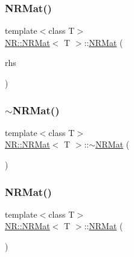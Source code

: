 \mbox{\label{classNR_1_1NRMat_a7ad1dc6f56c44d5d0a7b595d48206cfa}} 
\subsubsection{\texorpdfstring{NRMat()}{NRMat()}\hspace{0.1cm}{\footnotesize\ttfamily [10/15]}}
{\footnotesize\ttfamily template$<$class T$>$ \\
\mbox{\hyperlink{classNR_1_1NRMat}{N\+R\+::\+N\+R\+Mat}}$<$ T $>$\+::\mbox{\hyperlink{classNR_1_1NRMat}{N\+R\+Mat}} (\begin{DoxyParamCaption}\item[{const \mbox{\hyperlink{classNR_1_1NRMat}{N\+R\+Mat}}$<$ T $>$ \&}]{rhs }\end{DoxyParamCaption})}

\mbox{\label{classNR_1_1NRMat_a8b6826b7a7556a397ee7d7ad382e5dae}} 
\subsubsection{\texorpdfstring{$\sim$NRMat()}{~NRMat()}\hspace{0.1cm}{\footnotesize\ttfamily [2/3]}}
{\footnotesize\ttfamily template$<$class T$>$ \\
\mbox{\hyperlink{classNR_1_1NRMat}{N\+R\+::\+N\+R\+Mat}}$<$ T $>$\+::$\sim$\mbox{\hyperlink{classNR_1_1NRMat}{N\+R\+Mat}} (\begin{DoxyParamCaption}{ }\end{DoxyParamCaption})}

\mbox{\label{classNR_1_1NRMat_abcaca2687429fc0f26cde34647f7c981}} 
\subsubsection{\texorpdfstring{NRMat()}{NRMat()}\hspace{0.1cm}{\footnotesize\ttfamily [11/15]}}
{\footnotesize\ttfamily template$<$class T$>$ \\
\mbox{\hyperlink{classNR_1_1NRMat}{N\+R\+::\+N\+R\+Mat}}$<$ T $>$\+::\mbox{\hyperlink{classNR_1_1NRMat}{N\+R\+Mat}} (\begin{DoxyParamCaption}{ }\end{DoxyParamCaption})}

